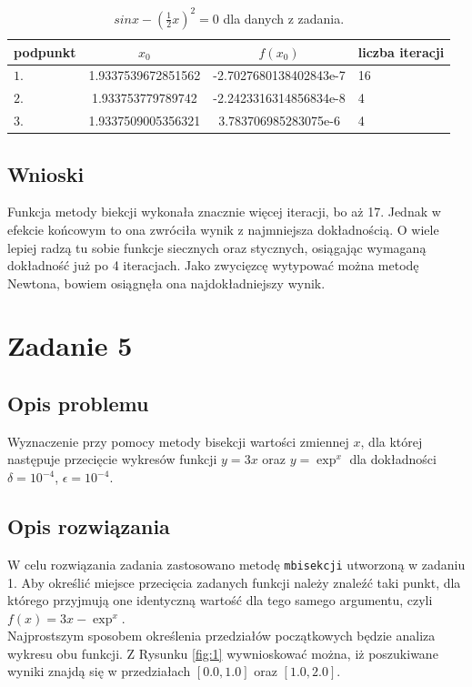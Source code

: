 \documentclass{classrep}
\begin{document}
		\begin{table}[!hpbt]
        		\centering
        		\footnotesize
			\begin{tabular}{lSSl} \toprule
				{podpunkt} & {$x_0$} & {$f(x_0)$} & {liczba iteracji}\\ \midrule
				$1.$ & 1.9337539672851562 & -2.7027680138402843e-7 & 16 \\ 
	 			$2.$ & 1.933753779789742 & -2.2423316314856834e-8 & 4 \\
	 			$3.$ & 1.9337509005356321 & 3.783706985283075e-6 & 4 \\ \bottomrule
	 		\end{tabular}
	 		\caption{$sin{x}-(\frac{1}{2}x)^2=0$ dla danych z zadania.}
			\label{table:1}
		\end{table}	
		
	\subsection{Wnioski}
		Funkcja metody biekcji wykonała znacznie więcej iteracji, bo aż 17. Jednak w efekcie końcowym to ona zwróciła wynik z najmniejsza dokładnością. 
		O wiele lepiej radzą tu sobie funkcje siecznych oraz stycznych, osiągając wymaganą dokładność już po 4 iteracjach. Jako zwycięzcę wytypować można metodę Newtona, bowiem osiągnęła ona najdokładniejszy wynik.
		
\section{Zadanie 5}
	\subsection{Opis problemu}
		Wyznaczenie przy pomocy metody bisekcji wartości zmiennej $x$, dla której następuje przecięcie wykresów funkcji $y=3x$ oraz $y=\exp^x$ dla dokładności $\delta=10^{-4}$, $\epsilon=10^{-4}$.
	
	\subsection{Opis rozwiązania}
		W celu rozwiązania zadania zastosowano metodę \texttt{mbisekcji} utworzoną w zadaniu 1.
		Aby określić miejsce przecięcia zadanych funkcji należy znaleźć taki punkt, dla którego przyjmują one identyczną wartość dla tego samego argumentu, czyli $f(x)=3x-\exp^x$. 	\\
		 Najprostszym sposobem określenia przedziałów początkowych będzie analiza wykresu obu funkcji. Z Rysunku \ref{fig:1} wywnioskować można, iż poszukiwane wyniki znajdą się w przedziałach $[0.0,1.0]$ oraz $[1.0,2.0]$.
		
\end{document}
